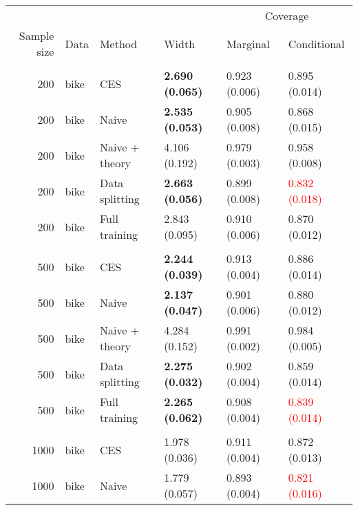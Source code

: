 \begin{tabular}[t]{rlllll}
\toprule
\multicolumn{4}{c}{ } & \multicolumn{2}{c}{Coverage} \\
\cmidrule(l{3pt}r{3pt}){5-6}
Sample size & Data & Method & Width & Marginal & Conditional\\
\midrule
\addlinespace[0.3em]
\multicolumn{6}{l}{\textbf{200}}\\
\hspace{1em}200 & bike & CES & \textbf{2.690 (0.065)} & 0.923 (0.006) & 0.895 (0.014)\\
\hspace{1em}200 & bike & Naive & \textbf{2.535 (0.053)} & 0.905 (0.008) & 0.868 (0.015)\\
\hspace{1em}200 & bike & Naive + theory & 4.106 (0.192) & 0.979 (0.003) & 0.958 (0.008)\\
\hspace{1em}200 & bike & Data splitting & \textbf{2.663 (0.056)} & 0.899 (0.008) & \textcolor{red}{0.832 (0.018)}\\
\hspace{1em}200 & bike & Full training & 2.843 (0.095) & 0.910 (0.006) & 0.870 (0.012)\\
\addlinespace[0.3em]
\multicolumn{6}{l}{\textbf{500}}\\
\hspace{1em}500 & bike & CES & \textbf{2.244 (0.039)} & 0.913 (0.004) & 0.886 (0.014)\\
\hspace{1em}500 & bike & Naive & \textbf{2.137 (0.047)} & 0.901 (0.006) & 0.880 (0.012)\\
\hspace{1em}500 & bike & Naive + theory & 4.284 (0.152) & 0.991 (0.002) & 0.984 (0.005)\\
\hspace{1em}500 & bike & Data splitting & \textbf{2.275 (0.032)} & 0.902 (0.004) & 0.859 (0.014)\\
\hspace{1em}500 & bike & Full training & \textbf{2.265 (0.062)} & 0.908 (0.004) & \textcolor{red}{0.839 (0.014)}\\
\addlinespace[0.3em]
\multicolumn{6}{l}{\textbf{1000}}\\
\hspace{1em}1000 & bike & CES & 1.978 (0.036) & 0.911 (0.004) & 0.872 (0.013)\\
\hspace{1em}1000 & bike & Naive & 1.779 (0.057) & 0.893 (0.004) & \textcolor{red}{0.821 (0.016)}\\

\end{tabular}
